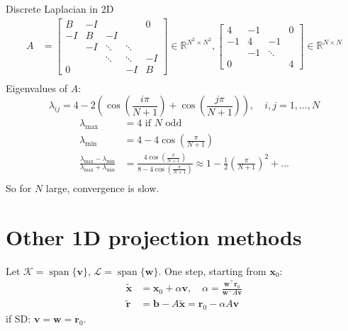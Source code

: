 \documentclass[../../main.tex]{subfiles}
\begin{document}
\begin{example}{Discrete Laplacian in 2D}{}
    \begin{align*}
        A & =
        \begin{bmatrix}
            B  & -I &        &        & 0  \\
            -I & B  & -I     &        &    \\
               & -I & \ddots & \ddots &    \\
               &    & \ddots & \ddots & -I \\
            0  &    &        & -I     & B
        \end{bmatrix} \in \mathbb{R}^{N^2 \times N^2},
        \begin{bmatrix}
            4  & -1 &        & 0 \\
            -1 & 4  & -1     &   \\
               & -1 & \ddots &   \\
            0  &    &        & 4
        \end{bmatrix} \in \mathbb{R}^{N \times N} \\
    \end{align*}
    Eigenvalues of $A$:
    \[
        \lambda_{ij} = 4 - 2\left(\cos\left(\frac{i \pi}{N+1}\right) + \cos\left(\frac{j \pi}{N+1}\right)\right), \quad i, j = 1, \ldots, N
    \]
    \begin{align*}
        \lambda_{\max}                                                          & = 4 \text{ if } N \text{ odd}                                                                                                                \\
        \lambda_{\min}                                                          & = 4 - 4\cos\left(\frac{\pi}{N+1}\right)                                                                                                      \\
        \frac{\lambda_{\max} - \lambda_{\min}}{\lambda_{\max} + \lambda_{\min}} & = \frac{4\cos\left(\frac{\pi}{N+1}\right)}{8 - 4\cos\left(\frac{\pi}{N+1}\right)} \approx 1 - \frac12\left(\frac{\pi}{N+1}\right)^2 + \ldots \\
    \end{align*}
    So for $N$ large, convergence is slow.
\end{example}

\section*{Other 1D projection methods}
Let $\mathcal{K} = \operatorname{span}\{\mathbf{v}\}$, $\mathcal{L} = \operatorname{span}\{\mathbf{w}\}$.
One step, starting from $\mathbf{x}_0$:
\begin{align*}
    \tilde{\mathbf{x}} & = \mathbf{x}_0 + \alpha \mathbf{v}, \quad \alpha = \frac{\mathbf{w}^{\top} \mathbf{r}_0}{\mathbf{w}^{\top} A \mathbf{v}} \\
    \tilde{\mathbf{r}} & = \mathbf{b} - A\tilde{\mathbf{x}} = \mathbf{r}_0 - \alpha A \mathbf{v}
\end{align*}
if SD: $\mathbf{v} = \mathbf{w} = \mathbf{r}_0$.
\end{document}

